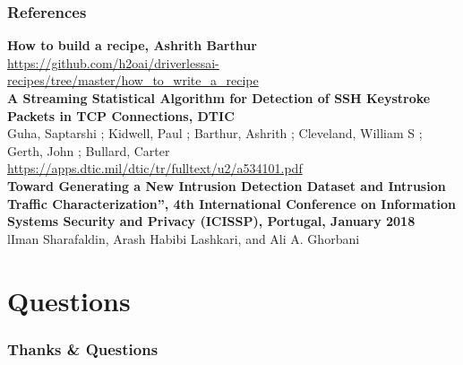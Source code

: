 \documentclass[11pt,
               aspectratio=169,
               hyperref={colorlinks}
               ]{beamer}
\begin{document}
	\begin{frame}[t, allowframebreaks]
	
		\frametitle{References}	
		
			\textbf{How to build a recipe, Ashrith Barthur}\\
			\small{\url{https://github.com/h2oai/driverlessai-recipes/tree/master/how_to_write_a_recipe}}\\
            \textbf{A Streaming Statistical Algorithm for Detection of SSH Keystroke Packets in TCP Connections, DTIC}\\
            \small{Guha, Saptarshi ; Kidwell, Paul ; Barthur, Ashrith ; Cleveland, William S ; Gerth, John ; Bullard, Carter}\\
            \small{\url{https://apps.dtic.mil/dtic/tr/fulltext/u2/a534101.pdf}}\\
            \textbf{Toward Generating a New Intrusion Detection Dataset and Intrusion Traffic Characterization”, 4th International Conference on Information Systems Security and Privacy (ICISSP), Portugal, January 2018}\\
            \small{lIman Sharafaldin, Arash Habibi Lashkari, and Ali A. Ghorbani}\\

			
		\framebreak		
		
		\printbibliography
		
	\end{frame}
	\section{Questions}

		\begin{frame}

                \frametitle{Thanks \& Questions}

		\end{frame}
\end{document}
